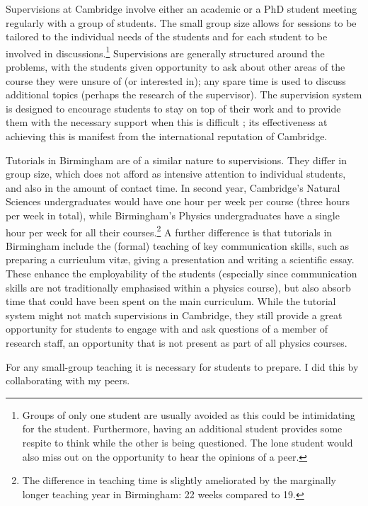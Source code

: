 Supervisions at Cambridge involve either an academic or a PhD student meeting regularly with a group of students. The small group size allows for sessions to be tailored to the individual needs of the students and for each student to be involved in discussions.\footnote{Groups of only one student are usually avoided as this could be intimidating for the student. Furthermore, having an additional student provides some respite to think while the other is being questioned. The lone student would also miss out on the opportunity to hear the opinions of a peer.} Supervisions are generally structured around the problems, with the students given opportunity to ask about other areas of the course they were unsure of (or interested in); any spare time is used to discuss additional topics (perhaps the research of the supervisor). The supervision system is designed to encourage students to stay on top of their work and to provide them with the necessary support when this is difficult \citep[case study 12.1]{Gibbs2015}; its effectiveness at achieving this is manifest from the international reputation of Cambridge.

Tutorials in Birmingham are of a similar nature to supervisions. They differ in group size, which does not afford as intensive attention to individual students, and also in the amount of contact time. In second year, Cambridge's Natural Sciences undergraduates would have one hour per week per course (three hours per week in total), while Birmingham's Physics undergraduates have a single hour per week for all their courses.\footnote{The difference in teaching time is slightly ameliorated by the marginally longer teaching year in Birmingham: 22 weeks compared to 19.} A further difference is that tutorials in Birmingham include the (formal) teaching of key communication skills, such as preparing a curriculum vit\ae, giving a presentation and writing a scientific essay. These enhance the employability of the students (especially since communication skills are not traditionally emphasised within a physics course), but also absorb time that could have been spent on the main curriculum. While the tutorial system might not match supervisions in Cambridge, they still provide a great opportunity for students to engage with and ask questions of a member of research staff, an opportunity that is not present as part of all physics courses.

For any small-group teaching it is necessary for students to prepare. I did this by collaborating with my peers.

